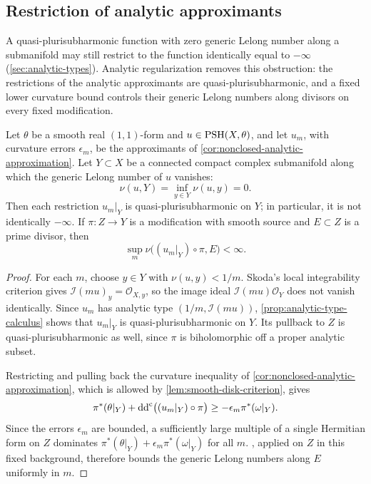 \subsection{Restriction of analytic approximants}

A quasi-plurisubharmonic function with zero generic Lelong number along a submanifold may still restrict to the function identically equal to $-\infty$ (\cref{sec:analytic-types}). Analytic regularization removes this obstruction: the restrictions of the analytic approximants are quasi-plurisubharmonic, and a fixed lower curvature bound controls their generic Lelong numbers along divisors on every fixed modification.

\begin{corollary}\label{cor:restricted-analytic-divisorial-bound}
Let $\theta$ be a smooth real $(1,1)$-form and $u\in\mathrm{PSH}(X,\theta)$, and let $u_m$, with curvature errors $\epsilon_m$, be the approximants of \cref{cor:nonclosed-analytic-approximation}. Let $Y\subset X$ be a connected compact complex submanifold along which the generic Lelong number of $u$ vanishes:
\[
 \nu(u,Y)=\inf_{y\in Y}\nu(u,y)=0.
\]
Then each restriction $u_m|_Y$ is quasi-plurisubharmonic on $Y$; in particular, it is not identically $-\infty$. If $\pi\colon Z\to Y$ is a modification with smooth source and $E\subset Z$ is a prime divisor, then
\[
 \sup_m\nu\bigl((u_m|_Y)\circ\pi,E\bigr)<\infty.
\]
\end{corollary}
\begin{proof}
For each $m$, choose $y\in Y$ with $\nu(u,y)<1/m$. Skoda's local integrability criterion gives $\mathcal I(mu)_y=\mathcal O_{X,y}$, so the image ideal $\mathcal I(mu)\mathcal O_Y$ does not vanish identically. Since $u_m$ has analytic type $(1/m,\mathcal I(mu))$, \cref{prop:analytic-type-calculus} shows that $u_m|_Y$ is quasi-plurisubharmonic on $Y$. Its pullback to $Z$ is quasi-plurisubharmonic as well, since $\pi$ is biholomorphic off a proper analytic subset.

Restricting and pulling back the curvature inequality of \cref{cor:nonclosed-analytic-approximation}, which is allowed by \cref{lem:smooth-disk-criterion}, gives
\[
 \pi^*(\theta|_Y)+\mathrm{dd}^{\mathrm{c}}\bigl((u_m|_Y)\circ\pi\bigr)
 \geq-\epsilon_m\pi^*(\omega|_Y).
\]
Since the errors $\epsilon_m$ are bounded, a sufficiently large multiple of a single Hermitian form on $Z$ dominates $\pi^*(\theta|_Y)+\epsilon_m\pi^*(\omega|_Y)$ for all $m$. , applied on $Z$ in this fixed background, therefore bounds the generic Lelong numbers along $E$ uniformly in $m$.
\end{proof}
